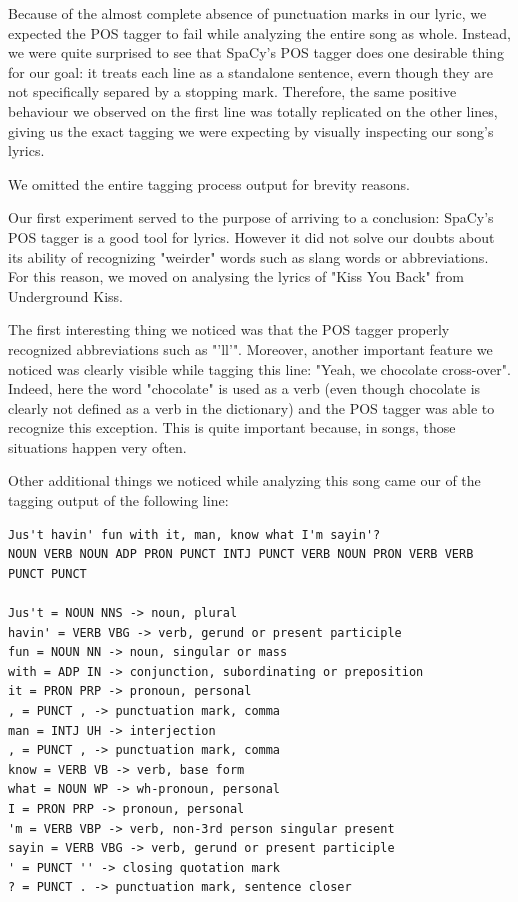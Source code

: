 Because of the almost complete absence of punctuation marks in our lyric, we expected
the POS tagger to fail while analyzing the entire song as whole. Instead, we were quite
surprised to see that SpaCy's POS tagger does one desirable thing for our goal:
it treats each line as a standalone sentence, evern though they are not specifically separed by
a stopping mark. Therefore, the same positive behaviour we observed on the first line
was totally replicated on the other lines, giving us the exact tagging we were
expecting by visually inspecting our song's lyrics.

We omitted the entire tagging process output for brevity reasons.

Our first experiment served to the purpose of arriving to a conclusion: SpaCy's POS tagger
is a good tool for lyrics. However it did not solve our doubts about its ability of recognizing
"weirder" words such as slang words or abbreviations. For this reason, we moved on 
analysing the lyrics of "Kiss You Back" from Underground Kiss.

The first interesting thing we noticed was that the POS tagger properly recognized abbreviations such as "'ll'".
Moreover, another important feature we noticed was clearly visible while tagging this line: "Yeah, we chocolate cross-over".
Indeed, here the word "chocolate" is used as a verb (even though chocolate is clearly not defined as a verb in 
the dictionary) and the POS tagger was able to recognize this exception. 
This is quite important because, in songs, those situations happen very often.

Other additional things we noticed while analyzing this song came our of the tagging output of the following line:

\begin{lstlisting}
Jus't havin' fun with it, man, know what I'm sayin'?
NOUN VERB NOUN ADP PRON PUNCT INTJ PUNCT VERB NOUN PRON VERB VERB PUNCT PUNCT 

Jus't = NOUN NNS -> noun, plural
havin' = VERB VBG -> verb, gerund or present participle
fun = NOUN NN -> noun, singular or mass
with = ADP IN -> conjunction, subordinating or preposition
it = PRON PRP -> pronoun, personal
, = PUNCT , -> punctuation mark, comma
man = INTJ UH -> interjection
, = PUNCT , -> punctuation mark, comma
know = VERB VB -> verb, base form
what = NOUN WP -> wh-pronoun, personal
I = PRON PRP -> pronoun, personal
'm = VERB VBP -> verb, non-3rd person singular present
sayin = VERB VBG -> verb, gerund or present participle
' = PUNCT '' -> closing quotation mark
? = PUNCT . -> punctuation mark, sentence closer
\end{lstlisting}

